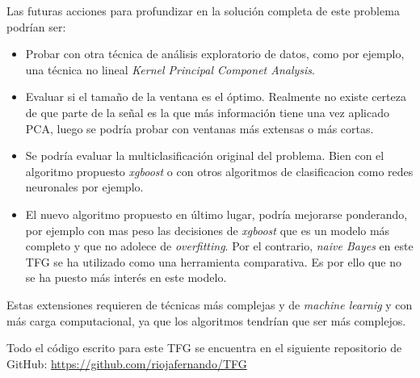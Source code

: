 Las futuras acciones para profundizar en la solución completa de este problema podrían ser:
\begin{itemize}
	\item Probar con otra técnica de análisis exploratorio de datos, como por ejemplo, una técnica no lineal \textit{Kernel Principal Componet Analysis}.
	\item Evaluar si el tamaño de la ventana es el óptimo. Realmente no existe certeza de que parte de la señal es la que más información tiene una vez aplicado PCA, luego se podría probar con ventanas más extensas o más cortas.
	\item Se podría evaluar la multiclasificación original del problema. Bien con el algoritmo propuesto \textit{xgboost} o con otros algoritmos de clasificacion como redes neuronales por ejemplo.
	\item El nuevo algoritmo propuesto en último lugar, podría mejorarse ponderando, por ejemplo con mas peso las decisiones de \textit{xgboost} que es un modelo más completo y que no adolece de \textit{overfitting}. Por el contrario, \textit{naive Bayes} en este TFG se ha utilizado como una herramienta comparativa. Es por ello que no se ha puesto más interés en este modelo.
\end{itemize}

Estas extensiones requieren de técnicas más complejas y de \textit{machine learnig} y con más carga computacional, ya que los algoritmos tendrían que ser más complejos.\par 
\vspace*{0.5cm}
Todo el código escrito para este TFG se encuentra en el siguiente repositorio de GitHub: \url{https://github.com/riojafernando/TFG}

